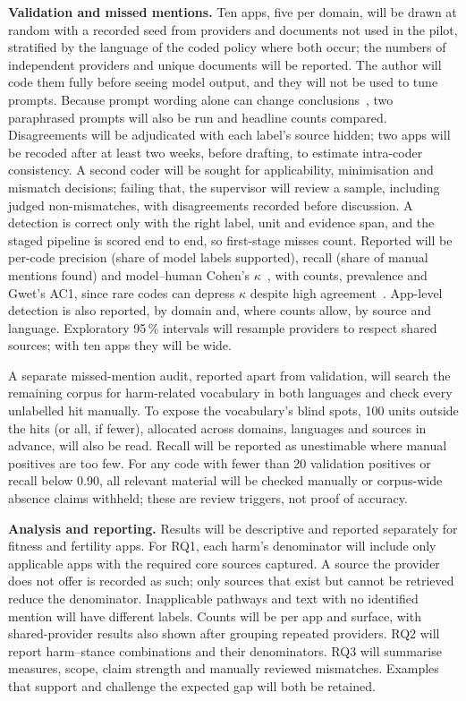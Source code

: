 \documentclass[sigconf,nonacm,natbib=false]{acmart}
\begin{document}
\textbf{Validation and missed mentions.} Ten apps, five per domain, will be
drawn at random with a recorded seed from providers and documents not used in
the pilot, stratified by the language of the coded policy where both occur;
the numbers of independent providers and unique documents will be reported.
The author will code them fully before seeing model output, and they will not
be used to tune prompts. Because prompt wording alone can change
conclusions~\parencite{baumann2025llm}, two paraphrased prompts will also be
run and headline counts compared. Disagreements will be adjudicated with each
label's source hidden; two apps will be recoded after at least two weeks,
before drafting, to estimate intra-coder consistency. A second coder will be
sought for applicability, minimisation and mismatch decisions; failing that,
the supervisor will review a sample, including judged non-mismatches, with
disagreements recorded before discussion. A detection is correct only with
the right label, unit and evidence span, and the staged pipeline is scored end
to end, so first-stage misses count. Reported will be per-code precision
(share of model labels supported), recall (share of manual mentions found)
and model--human Cohen's $\kappa$~\parencite{cohen1960coefficient}, with
counts, prevalence and Gwet's AC1, since rare codes can depress $\kappa$
despite high agreement~\parencite{feinstein1990high,gwet2008computing}.
App-level detection is also reported, by domain and, where counts allow, by
source and language. Exploratory 95\,\% intervals will resample providers to
respect shared sources; with ten apps they will be wide.

A separate missed-mention audit, reported apart from validation, will search
the remaining corpus for harm-related vocabulary in both languages and check
every unlabelled hit manually. To expose the vocabulary's blind spots, 100
units outside the hits (or all, if fewer), allocated across domains, languages
and sources in advance, will also be read. Recall will be reported as
unestimable where manual positives are too few. For any code with fewer than
20 validation positives or recall below 0.90, all relevant material will be
checked manually or corpus-wide absence claims withheld; these are review
triggers, not proof of accuracy.

\textbf{Analysis and reporting.} Results will be descriptive and reported
separately for fitness and fertility apps. For RQ1, each harm's denominator
will include only applicable apps with the required core sources captured. A
source the provider does not offer is recorded as such; only sources that
exist but cannot be retrieved reduce the denominator. Inapplicable pathways
and text with no identified mention will have different labels. Counts will be per app and surface, with
shared-provider results also shown after grouping repeated providers.
RQ2 will report harm--stance combinations and their denominators. RQ3 will
summarise measures, scope, claim strength and manually reviewed mismatches.
Examples that support and challenge the expected gap will both be retained.
\end{document}
